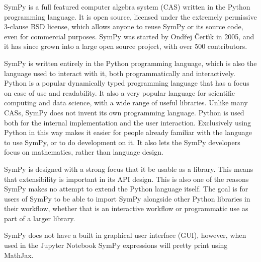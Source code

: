 SymPy is a full featured computer algebra system (CAS) written in the Python
programming language. It is open source, licensed under the extremely
permissive 3-clause BSD license, which allows anyone to reuse SymPy or its source code,
even for commercial purposes. SymPy was started by Ond\v{r}ej \v{C}ert\'{\i}k
in 2005, and it has since grown into a large open source project, with over
500 contributors.

SymPy is written entirely in the Python programming language,
which is also the language used to interact with it, both programmatically and
interactively. Python is a popular dynamically typed programming language that
has a focus on ease of use and readability. It also a very popular language
for scientific computing and data science, with a wide range of useful
libraries.
Unlike many CASs, SymPy does not invent its own programming language. Python
is used both for the internal implementation and the user interaction.
Exclusively using Python in this way makes it easier for people already
familiar with the language to use SymPy, or to do development on it. It also
lets the SymPy developers focus on mathematics, rather than language design.

SymPy is designed with a strong focus that it be usable as a library. This
means that extensibility is important in its API design. This is also one of
the reasons SymPy makes no attempt to extend the Python language itself. The
goal is for users of SymPy to be able to import SymPy alongside other Python
libraries in their workflow, whether that is an interactive workflow or
programmatic use as part of a larger library.

SymPy does not have a built in graphical user interface (GUI), however, when
used in the Jupyter Notebook
SymPy expressions will pretty print using MathJax.
